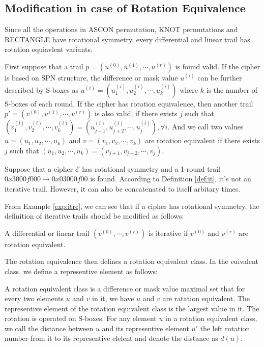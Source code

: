 \subsection{Modification in case of Rotation Equivalence}

Since all the operations in ASCON permutation, KNOT permutations and RECTANGLE have rotational symmetry, every differential and linear trail has rotation equiavlent variants. 

\begin{definition}
	First suppose that a trail $p=(u^{(0)},u^{(1)},\cdots,u^{(r)})$ is found valid. If the cipher is based on SPN structure, the difference or mask value $u^{(i)}$ can be further described by S-boxes as $u^{(i)}=(u_1^{(i)},u_2^{(i)},\cdots,u_k^{(i)})$ where $k$ is the number of S-boxes of each round. If the cipher has rotation equivalence, then another trail $p'=(v^{(0)},v^{(1)},\cdots,v^{(r)})$ is also valid, if there exists $j$ such that $(v_1^{(i)},v_2^{(i)},\cdots,v_k^{(i)})=(u_{j+1}^{(i)},u_{j+2}^{(i)},\cdots,u_{j}^{(i)}),\forall i$. And we call two values $u=(u_1,u_2,\cdots,u_k)$ and $v=(v_1,v_2,\cdots,v_k)$ are rotation equivalent if there exists $j$ such that $(u_1,u_2,\cdots,u_k)=(v_{j+1},v_{j+2},\cdots,v_{j})$. 
\end{definition}

\begin{example}\label{exp:itre}
	Suppose that a cipher $\mathcal{E}$ has rotational symmetry and a 1-round trail $0x3000f000\rightarrow 0x03000f00$ is found. According to Definition \ref{def:it}, it's not an iterative trail. However, it can also be concatenated to itself arbitary times.
\end{example}

From Example \ref{exp:itre}, we can see that if a cipher has rotational symmetry, the definition of iterative trails should be modified as follows:  

\begin{definition}
	A differential or linear trail $(v^{(0)},\cdots,v^{(r)})$ is iterative if $v^{(0)}$ and $v^{(r)}$ are rotation equivalent.
\end{definition}

The rotation equivalence then defines a rotation equivalent class. In the euivalent class, we define a representive element as follows:

\begin{definition}
	A rotation equivalent class is a difference or mask value maximal set that for every two elements $u$ and $v$ in it, we have $u$ and $v$ are ratation equivalent. The representive element of the rotation equivalent class is the largest value in it. The rotation is operated on S-boxes. For any element $u$ in a rotation equivalent class, we call the distance between $u$ and its representive element $u'$ the left rotation number from it to its representive elelent and denote the distance as $d(u)$. 
\end{definition}

